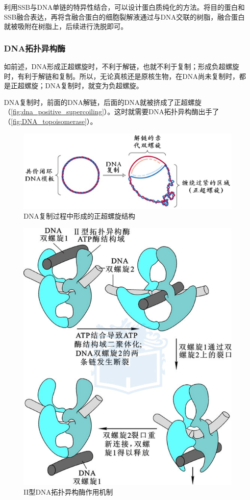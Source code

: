 利用SSB与DNA单链的特异性结合，可以设计蛋白质纯化的方法。将目的蛋白和SSB融合表达，再将含融合蛋白的细胞裂解液通过与DNA交联的树脂，融合蛋白就被吸附在树脂上，后续进行洗脱即可。

\subsubsection{DNA拓扑异构酶}

如前述，DNA形成正超螺旋时，不利于解链，也就不利于复制；形成负超螺旋时，有利于解链和复制。所以，无论真核还是原核生物，在DNA尚未复制时，都是正超螺旋；DNA复制时，就变为负超螺旋。

DNA复制时，前面的DNA解链，后面的DNA就被挤成了正超螺旋（\autoref{fig:dna_positive_supercoiling}）。这时就需要DNA拓扑异构酶出手了（\autoref{fig:DNA_topoisomerase}）。

\begin{figure}[h]
	\centering
	\includegraphics[width=0.7\linewidth]{Pics/DNA形成正超螺旋}
	\caption{DNA复制过程中形成的正超螺旋结构}
	\label{fig:dna_positive_supercoiling}
\end{figure}

\begin{figure}[h]
	\centering
	\includegraphics[width=0.7\linewidth]{Pics/DNA拓扑异构酶}
	\caption{II型DNA拓扑异构酶作用机制}
	\label{fig:DNA_topoisomerase}
\end{figure}

